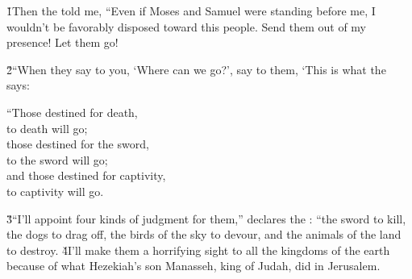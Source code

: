 \v{1}Then the  told me, ``Even if Moses and Samuel were standing before me, I wouldn't be favorably disposed toward this people. Send them out of my presence! Let them go!

\v{2}``When they say to you, `Where can we go?', say to them, `This is what the  says:

\begin{poetry}
\poeml ``Those destined for death, \\
\poemll    to death will go; \\
\poeml those destined for the sword, \\
\poemll    to the sword will go; \\
\poeml and those destined for captivity, \\
\poemll    to captivity will go.
\end{poetry}

\v{3}``I'll appoint four kinds of judgment for them,'' declares the : ``the sword to kill, the dogs to drag off, the birds of the sky to devour, and the animals of the land to destroy. \v{4}I'll make them a horrifying sight to all the kingdoms of the earth because of what Hezekiah's son Manasseh, king of Judah, did in Jerusalem.

